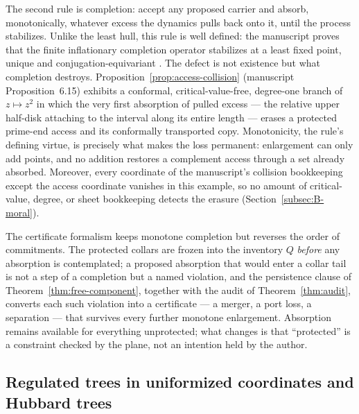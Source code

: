\documentclass[11pt,reqno]{amsart}
\theoremstyle{definition}
\theoremstyle{remark}
\begin{document}
The second rule is completion: accept any proposed carrier and absorb,
monotonically, whatever excess the dynamics pulls back onto it, until the
process stabilizes.  Unlike the least hull, this rule is well defined:
the manuscript proves that the finite inflationary completion operator
stabilizes at a least fixed point, unique and conjugation-equivariant
\cite[Theorem~6.14]{MWman}.  The defect is not existence but what
completion destroys.  Proposition~\ref{prop:access-collision} (manuscript
Proposition~6.15) exhibits a conformal, critical-value-free, degree-one
branch of $z\mapsto z^2$ in which the very first absorption of pulled
excess --- the relative upper half-disk attaching to the interval along
its entire length --- erases a protected prime-end access and its
conformally transported copy.  Monotonicity, the rule's defining virtue,
is precisely what makes the loss permanent: enlargement can only add
points, and no addition restores a complement access through a set
already absorbed.  Moreover, every coordinate of the manuscript's
collision bookkeeping except the access coordinate vanishes in this
example, so no amount of critical-value, degree, or sheet bookkeeping
detects the erasure (Section~\ref{subsec:B-moral}).

The certificate formalism keeps monotone completion but reverses the
order of commitments.  The protected collars are frozen into the
inventory $Q$ \emph{before} any absorption is contemplated; a proposed
absorption that would enter a collar tail is not a step of a completion
but a named violation, and the persistence clause of
Theorem~\ref{thm:free-component}, together with the audit of
Theorem~\ref{thm:audit}, converts each such violation into a certificate
--- a merger, a port loss, a separation --- that survives every further
monotone enlargement.  Absorption remains available for everything
unprotected; what changes is that ``protected'' is a constraint checked
by the plane, not an intention held by the author.

\subsection{Regulated trees in uniformized coordinates and Hubbard trees}
\label{subsec:A-comp-trees}
\end{document}
